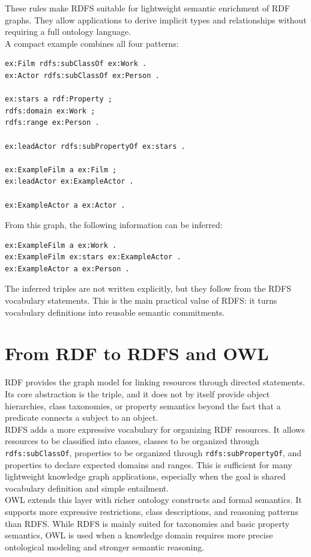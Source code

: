 \documentclass{scrbook}
\begin{document}
	These rules make RDFS suitable for lightweight semantic enrichment of RDF graphs. They allow applications to derive implicit types and relationships without requiring a full ontology language.\\
	
	A compact example combines all four patterns:
	\begin{lstlisting}
ex:Film rdfs:subClassOf ex:Work .
ex:Actor rdfs:subClassOf ex:Person .
		
ex:stars a rdf:Property ;
rdfs:domain ex:Work ;
rdfs:range ex:Person .
		
ex:leadActor rdfs:subPropertyOf ex:stars .
		
ex:ExampleFilm a ex:Film ;
ex:leadActor ex:ExampleActor .
		
ex:ExampleActor a ex:Actor .
	\end{lstlisting}
	
	From this graph, the following information can be inferred:
	\begin{lstlisting}
ex:ExampleFilm a ex:Work .
ex:ExampleFilm ex:stars ex:ExampleActor .
ex:ExampleActor a ex:Person .
	\end{lstlisting}
	
	The inferred triples are not written explicitly, but they follow from the RDFS vocabulary statements. This is the main practical value of RDFS: it turns vocabulary definitions into reusable semantic commitments.
	
	\section{From RDF to RDFS and OWL}
	
	RDF provides the graph model for linking resources through directed statements. Its core abstraction is the triple, and it does not by itself provide object hierarchies, class taxonomies, or property semantics beyond the fact that a predicate connects a subject to an object.\\
	
	RDFS adds a more expressive vocabulary for organizing RDF resources. It allows resources to be classified into classes, classes to be organized through \texttt{rdfs:subClassOf}, properties to be organized through \texttt{rdfs:subPropertyOf}, and properties to declare expected domains and ranges. This is sufficient for many lightweight knowledge graph applications, especially when the goal is shared vocabulary definition and simple entailment.\\
	
	OWL extends this layer with richer ontology constructs and formal semantics. It supports more expressive restrictions, class descriptions, and reasoning patterns than RDFS. While RDFS is mainly suited for taxonomies and basic property semantics, OWL is used when a knowledge domain requires more precise ontological modeling and stronger semantic reasoning.
\end{document}
